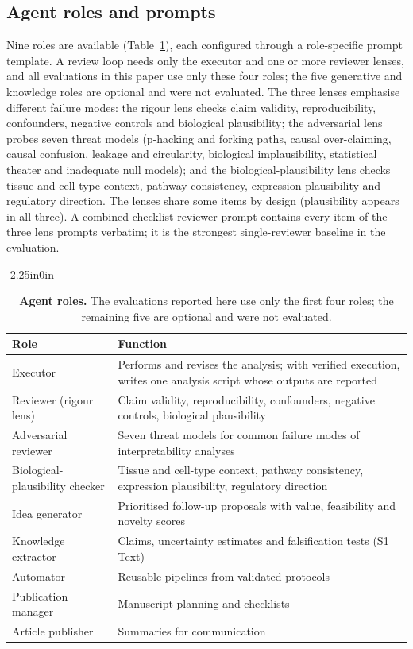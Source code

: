 \subsection*{Agent roles and prompts}

Nine roles are available (Table~\ref{table_roles}), each configured through a role-specific prompt template. A review loop needs only the executor and one or more reviewer lenses, and all evaluations in this paper use only these four roles; the five generative and knowledge roles are optional and were not evaluated. The three lenses emphasise different failure modes: the rigour lens checks claim validity, reproducibility, confounders, negative controls and biological plausibility; the adversarial lens probes seven threat models (p-hacking and forking paths, causal over-claiming, causal confusion, leakage and circularity, biological implausibility, statistical theater and inadequate null models); and the biological-plausibility lens checks tissue and cell-type context, pathway consistency, expression plausibility and regulatory direction. The lenses share some items by design (plausibility appears in all three). A combined-checklist reviewer prompt contains every item of the three lens prompts verbatim; it is the strongest single-reviewer baseline in the evaluation.

\begin{table}[!ht]
\begin{adjustwidth}{-2.25in}{0in}
\centering
\caption{{\bf Agent roles.} The evaluations reported here use only the first four roles; the remaining five are optional and were not evaluated.}
\label{table_roles}
\begin{tabular}{@{}lp{10.5cm}@{}}
\hline
\textbf{Role} & \textbf{Function} \\ \hline
Executor & Performs and revises the analysis; with verified execution, writes one analysis script whose outputs are reported \\
Reviewer (rigour lens) & Claim validity, reproducibility, confounders, negative controls, biological plausibility \\
Adversarial reviewer & Seven threat models for common failure modes of interpretability analyses \\
Biological-plausibility checker & Tissue and cell-type context, pathway consistency, expression plausibility, regulatory direction \\
Idea generator & Prioritised follow-up proposals with value, feasibility and novelty scores \\
Knowledge extractor & Claims, uncertainty estimates and falsification tests (S1 Text) \\
Automator & Reusable pipelines from validated protocols \\
Publication manager & Manuscript planning and checklists \\
Article publisher & Summaries for communication \\ \hline
\end{tabular}
\end{adjustwidth}
\end{table}

